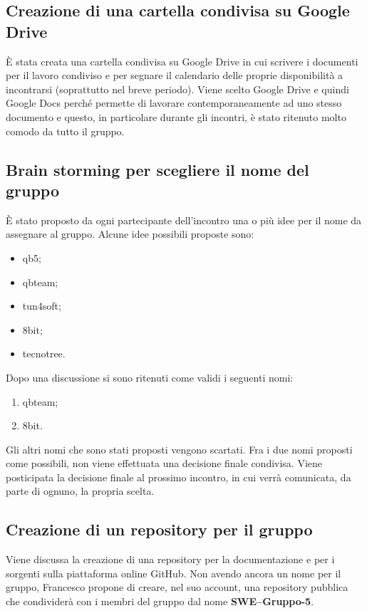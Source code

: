 \subsection{Creazione di una cartella condivisa su Google Drive}
È stata creata una cartella condivisa su Google Drive in cui scrivere i documenti per il lavoro condiviso e per segnare il calendario delle proprie disponibilità a incontrarsi (soprattutto nel breve periodo).
Viene scelto Google Drive e quindi Google Docs perché permette di lavorare contemporaneamente ad uno stesso documento e questo, in particolare durante gli incontri, è stato ritenuto molto comodo da tutto il gruppo.

\subsection{Brain storming per scegliere il nome del gruppo}
È stato proposto da ogni partecipante dell'incontro una o più idee per il nome da assegnare al gruppo. Alcune idee possibili proposte sono:
\begin{itemize}
	\item qb5;
	\item qbteam;
	\item tun4soft;
	\item 8bit;
	\item tecnotree.
\end{itemize}
Dopo una discussione si sono ritenuti come validi i seguenti nomi:
\begin{enumerate}
	\item qbteam;
	\item 8bit.
\end{enumerate}
Gli altri nomi che sono stati proposti vengono scartati. Fra i due nomi proposti come possibili, non viene effettuata una decisione finale condivisa. Viene posticipata la decisione finale al prossimo incontro, in cui verrà comunicata, da parte di ognuno, la propria scelta.

\subsection{Creazione di un repository per il gruppo}
Viene discussa la creazione di una repository per la documentazione e per i sorgenti sulla piattaforma online GitHub.
Non avendo ancora un nome per il gruppo, Francesco propone di creare, nel suo account, una repository pubblica che condividerà con i membri del gruppo dal nome \textbf{SWE--Gruppo-5}.

